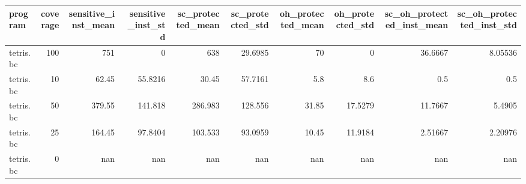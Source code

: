 \begin{tabular}{lrrrrrrrrr}
\hline
 program   &   coverage &   sensitive\_inst\_mean &   sensitive\_inst\_std &   sc\_protected\_mean &   sc\_protected\_std &   oh\_protected\_mean &   oh\_protected\_std &   sc\_oh\_protected\_inst\_mean &   sc\_oh\_protected\_inst\_std \\
\hline
 tetris.bc &        100 &                751    &               0      &             638     &            29.6985 &               70    &             0      &                    36.6667  &                    8.05536 \\
 tetris.bc &         10 &                 62.45 &              55.8216 &              30.45  &            57.7161 &                5.8  &             8.6    &                     0.5     &                    0.5     \\
 tetris.bc &         50 &                379.55 &             141.818  &             286.983 &           128.556  &               31.85 &            17.5279 &                    11.7667  &                    5.4905  \\
 tetris.bc &         25 &                164.45 &              97.8404 &             103.533 &            93.0959 &               10.45 &            11.9184 &                     2.51667 &                    2.20976 \\
 tetris.bc &          0 &                nan    &             nan      &             nan     &           nan      &              nan    &           nan      &                   nan       &                  nan       \\
\hline
\end{tabular}